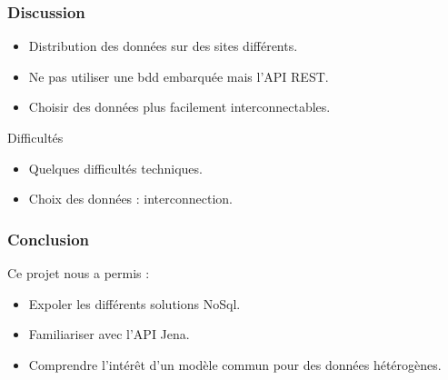 \documentclass[12pt]{beamer}
\begin{document}
\begin{frame}


\frametitle{Discussion}
\begin{itemize}
\item Distribution des données sur des sites différents.
\item Ne pas utiliser une bdd embarquée mais l'API REST.
\item Choisir des données plus facilement interconnectables.
\end{itemize}
\begin{block}{Difficultés}
\begin{itemize}
\item Quelques difficultés techniques.
\item Choix des données : interconnection.
\end{itemize}
\end{block}
\end{frame}
\begin{frame}


\frametitle{Conclusion}
Ce projet nous a permis :
\begin{itemize}
\item Expoler les différents solutions NoSql.
\item Familiariser avec l'API Jena.
\item Comprendre l'intérêt d'un modèle commun pour des données hétérogènes. 
\end{itemize}

\end{frame}
\end{document}
